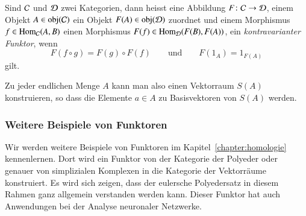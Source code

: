\begin{definition}
Sind $\cal C$ und $\cal D$ zwei Kategorien, dann heisst eine Abbildung
$F\colon\cal C\to \cal D$, einem Objekt $A\in \operatorname{obj}(\cal C)$
ein Objekt $F(A)\in\operatorname{obj}(\cal D)$ zuordnet und einem
Morphismus $f\in\operatorname{Hom}_{\cal C}(A,B)$ einen Morphismus
$F(f)\in\operatorname{Hom}_{\cal D}(F(B),F(A))$, ein
{\em kontravarianter Funktor},
wenn
\[
F(f\circ g)=F(g)\circ F(f)
\qquad\text{und}\qquad
F(1_A)=1_{F(A)}
\]
gilt.
\end{definition}

Zu jeder endlichen Menge $A$ kann man also einen Vektorraum $S(A)$
konstruieren, so dass die Elemente $a\in A$ zu Basisvektoren von $S(A)$
werden.

\subsubsection{Weitere Beispiele von Funktoren}
Wir werden weitere Beispiele von Funktoren im Kapitel~\ref{chapter:homologie}
kennenlernen.
Dort wird ein Funktor von der Kategorie der Polyeder oder
genauer von simplizialen Komplexen in die Kategorie der Vektorräume 
konstruiert.
Es wird sich zeigen, dass der eulersche Polyedersatz in diesem Rahmen
ganz allgemein verstanden werden kann.
Dieser Funktor hat auch Anwendungen bei der Analyse neuronaler Netzwerke.

